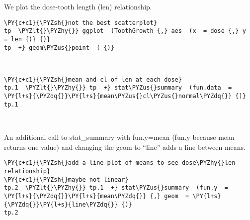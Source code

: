 We plot the dose-tooth length (len) relationship.

    \begin{tcolorbox}[breakable, size=fbox, boxrule=1pt, pad at break*=1mm,colback=cellbackground, colframe=cellborder]
\begin{Verbatim}[commandchars=\\\{\}]
\PY{c+c1}{\PYZsh{}not the best scatterplot}
tp  \PYZlt{}\PYZhy{}} ggplot  (ToothGrowth {,} aes  (x  = dose {,} y  = len {)} {)}
tp  +} geom\PYZus{}point  ( {)}
\end{Verbatim}
\end{tcolorbox}

    
    
    \begin{center}
    \end{center}
    { \hspace*{\fill} \\}
    
    \begin{tcolorbox}[breakable, size=fbox, boxrule=1pt, pad at break*=1mm,colback=cellbackground, colframe=cellborder]
\begin{Verbatim}[commandchars=\\\{\}]
\PY{c+c1}{\PYZsh{}mean and cl of len at each dose}
tp.1  \PYZlt{}\PYZhy{}} tp  +} stat\PYZus{}summary  (fun.data  = \PY{l+s}{\PYZdq{}}\PY{l+s}{mean\PYZus{}cl\PYZus{}normal\PYZdq{}} {)}
tp.1
\end{Verbatim}
\end{tcolorbox}

    
    
    \begin{center}
    \end{center}
    { \hspace*{\fill} \\}
    
    An additional call to stat\_summary with fun.y=mean (fun.y because mean
returns one value) and changing the geom to ``line'' adds a line between
means. ​

    \begin{tcolorbox}[breakable, size=fbox, boxrule=1pt, pad at break*=1mm,colback=cellbackground, colframe=cellborder]
\begin{Verbatim}[commandchars=\\\{\}]
\PY{c+c1}{\PYZsh{}add a line plot of means to see dose\PYZhy{}len relationship}
\PY{c+c1}{\PYZsh{}maybe not linear}
tp.2  \PYZlt{}\PYZhy{}} tp.1  +} stat\PYZus{}summary  (fun.y  = \PY{l+s}{\PYZdq{}}\PY{l+s}{mean\PYZdq{}} {,} geom  = \PY{l+s}{\PYZdq{}}\PY{l+s}{line\PYZdq{}} {)}
tp.2
\end{Verbatim}
\end{tcolorbox}

